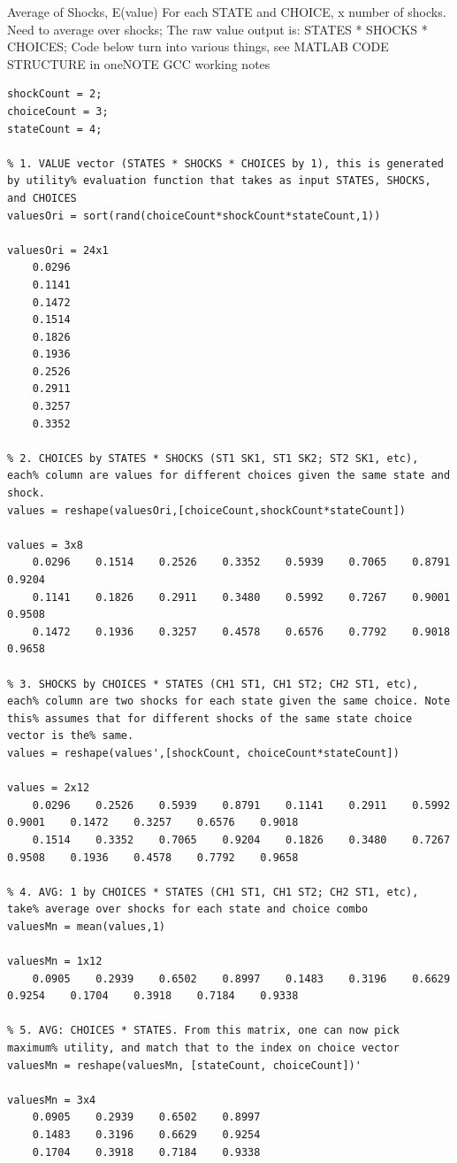 \documentclass[
]{book}
\begin{document}
Average of Shocks, E(value) For each STATE and CHOICE, x number of
shocks. Need to average over shocks; The raw value output is: STATES *
SHOCKS * CHOICES; Code below turn into various things, see MATLAB CODE
STRUCTURE in oneNOTE GCC working notes

\begin{verbatim}
shockCount = 2;
choiceCount = 3;
stateCount = 4;

% 1. VALUE vector (STATES * SHOCKS * CHOICES by 1), this is generated by utility% evaluation function that takes as input STATES, SHOCKS, and CHOICES
valuesOri = sort(rand(choiceCount*shockCount*stateCount,1))

valuesOri = 24x1    
    0.0296
    0.1141
    0.1472
    0.1514
    0.1826
    0.1936
    0.2526
    0.2911
    0.3257
    0.3352

% 2. CHOICES by STATES * SHOCKS (ST1 SK1, ST1 SK2; ST2 SK1, etc), each% column are values for different choices given the same state and shock.
values = reshape(valuesOri,[choiceCount,shockCount*stateCount])

values = 3x8    
    0.0296    0.1514    0.2526    0.3352    0.5939    0.7065    0.8791    0.9204
    0.1141    0.1826    0.2911    0.3480    0.5992    0.7267    0.9001    0.9508
    0.1472    0.1936    0.3257    0.4578    0.6576    0.7792    0.9018    0.9658

% 3. SHOCKS by CHOICES * STATES (CH1 ST1, CH1 ST2; CH2 ST1, etc), each% column are two shocks for each state given the same choice. Note this% assumes that for different shocks of the same state choice vector is the% same.
values = reshape(values',[shockCount, choiceCount*stateCount])

values = 2x12    
    0.0296    0.2526    0.5939    0.8791    0.1141    0.2911    0.5992    0.9001    0.1472    0.3257    0.6576    0.9018
    0.1514    0.3352    0.7065    0.9204    0.1826    0.3480    0.7267    0.9508    0.1936    0.4578    0.7792    0.9658

% 4. AVG: 1 by CHOICES * STATES (CH1 ST1, CH1 ST2; CH2 ST1, etc), take% average over shocks for each state and choice combo
valuesMn = mean(values,1)

valuesMn = 1x12    
    0.0905    0.2939    0.6502    0.8997    0.1483    0.3196    0.6629    0.9254    0.1704    0.3918    0.7184    0.9338

% 5. AVG: CHOICES * STATES. From this matrix, one can now pick maximum% utility, and match that to the index on choice vector
valuesMn = reshape(valuesMn, [stateCount, choiceCount])'

valuesMn = 3x4    
    0.0905    0.2939    0.6502    0.8997
    0.1483    0.3196    0.6629    0.9254
    0.1704    0.3918    0.7184    0.9338
\end{verbatim}
\end{document}
